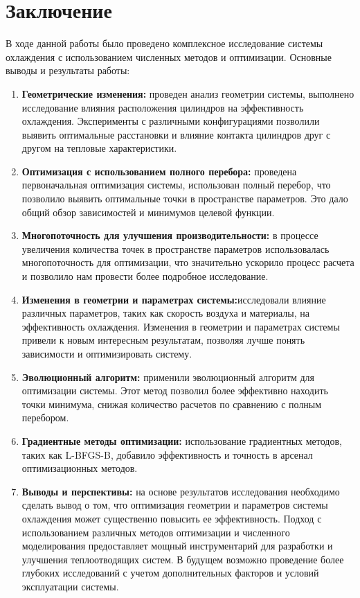 \documentclass[a4paper,12pt]{article}
\theoremstyle{plain} %
\theoremstyle{definition} %
\theoremstyle{remark} %
\begin{document}
\newpage
\section{Заключение}

В ходе данной работы было проведено комплексное исследование системы охлаждения с использованием численных методов и оптимизации. Основные выводы и результаты работы:

\begin{enumerate}
    \item \textbf{Геометрические изменения:} проведен анализ геометрии системы, выполнено исследование влияния расположения цилиндров на эффективность охлаждения. Эксперименты с различными конфигурациями позволили выявить оптимальные расстановки и влияние контакта цилиндров друг с другом на тепловые характеристики.

    \item \textbf{Оптимизация с использованием полного перебора:} проведена первоначальная оптимизация системы, использован полный перебор, что позволило выявить оптимальные точки в пространстве параметров. Это дало общий обзор зависимостей и минимумов целевой функции.

    \item \textbf{Многопоточность для улучшения производительности:} в процессе увеличения количества точек в пространстве параметров использовалась многопоточность для оптимизации, что значительно ускорило процесс расчета и позволило нам провести более подробное исследование.

    \item \textbf{Изменения в геометрии и параметрах системы:}исследовали влияние различных параметров, таких как скорость воздуха и материалы, на эффективность охлаждения. Изменения в геометрии и параметрах системы привели к новым интересным результатам, позволяя лучше понять зависимости и оптимизировать систему.

    \item \textbf{Эволюционный алгоритм:} применили эволюционный алгоритм для оптимизации системы. Этот метод позволил более эффективно находить точки минимума, снижая количество расчетов по сравнению с полным перебором.

    \item \textbf{Градиентные методы оптимизации:} использование градиентных методов, таких как L-BFGS-B, добавило эффективность и точность в арсенал оптимизационных методов.

    \item \textbf{Выводы и перспективы:} на основе результатов исследования необходимо сделать вывод о том, что оптимизация геометрии и параметров системы охлаждения может существенно повысить ее эффективность. Подход с использованием различных методов оптимизации и численного моделирования предоставляет мощный инструментарий для разработки и улучшения теплоотводящих систем. В будущем возможно проведение более глубоких исследований с учетом дополнительных факторов и условий эксплуатации системы.
\end{enumerate}
\end{document}

